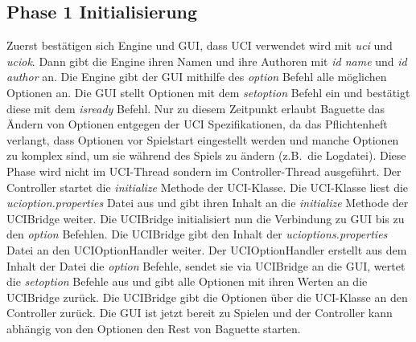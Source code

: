 \subsection{Phase 1 Initialisierung}\label{subsec:phase-1-initialisierung}
Zuerst best\"atigen sich Engine und GUI, dass UCI verwendet wird mit \textit{uci} und \textit{uciok}. \citeuci[59 - 66]
Dann gibt die Engine ihren Namen und ihre Authoren mit \textit{id name} und \textit{id author} an.
Die Engine gibt der GUI mithilfe des \textit{option} Befehl alle m\"oglichen Optionen an.
Die GUI stellt Optionen mit dem \textit{setoption} Befehl ein und best\"atigt diese mit dem \textit{isready} Befehl.
Nur zu diesem Zeitpunkt erlaubt Baguette das \"Andern von Optionen entgegen der UCI Spezifikationen\citeuci[89], da
das Pflichtenheft verlangt, dass Optionen vor Spielstart eingestellt werden und manche Optionen zu komplex sind, um sie
w\"ahrend des Spiels zu \"andern (z.B.\ die Logdatei).
\newline \newline
Diese Phase wird nicht im UCI-Thread sondern im Controller-Thread ausgef\"uhrt.
Der Controller startet die \textit{initialize} Methode der UCI-Klasse.
Die UCI-Klasse liest die \textit{ucioption.properties} Datei aus und gibt ihren Inhalt an die \textit{initialize} Methode
der UCIBridge weiter.
Die UCIBridge initialisiert nun die Verbindung zu GUI bis zu den \textit{option} Befehlen.
Die UCIBridge gibt den Inhalt der \textit{ucioptions.properties} Datei an den UCIOptionHandler weiter.
Der UCIOptionHandler erstellt aus dem Inhalt der Datei die \textit{option} Befehle, sendet sie via UCIBridge an die GUI,
wertet die \textit{setoption} Befehle aus und gibt alle Optionen mit ihren Werten an die UCIBridge zur\"uck.
Die UCIBridge gibt die Optionen \"uber die UCI-Klasse an den Controller zur\"uck.
Die GUI ist jetzt bereit zu Spielen und der Controller kann abh\"angig von den Optionen den Rest von Baguette starten.
